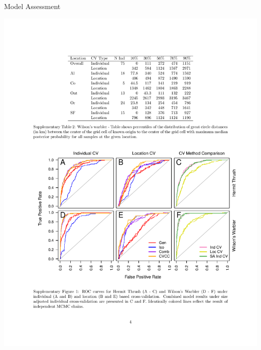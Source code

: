 \documentclass[11pt,ignorenonframetext,]{beamer}
\begin{document}
\begin{frame}{Model Assessment}

\begin{center}
\includegraphics[width=\textwidth]{figs/ROCs.pdf}
\end{center}

\end{frame}
\end{document}
